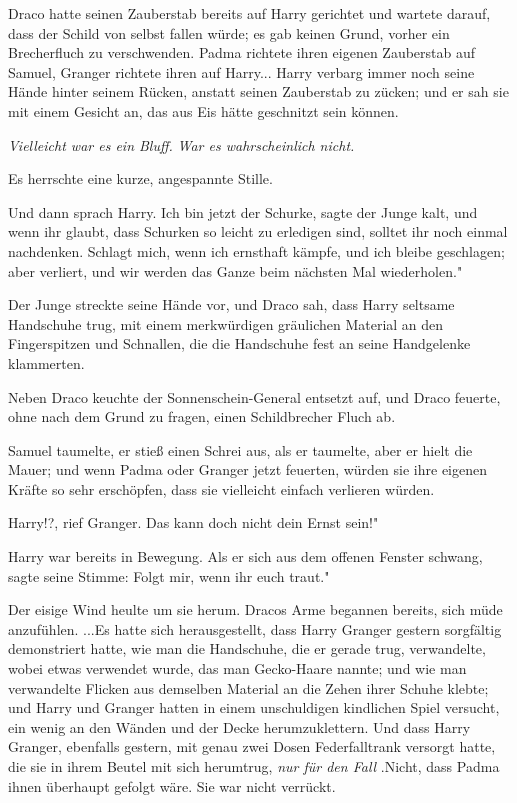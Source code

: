 Draco hatte seinen Zauberstab bereits auf Harry gerichtet und wartete darauf,
dass der Schild von selbst fallen würde; es gab keinen Grund, vorher ein
Brecherfluch zu verschwenden. Padma richtete ihren eigenen Zauberstab auf
Samuel, Granger richtete ihren auf Harry... Harry verbarg immer noch seine Hände
hinter seinem Rücken, anstatt seinen Zauberstab zu zücken; und er sah sie mit
einem Gesicht an, das aus Eis hätte geschnitzt sein können.

\emph{ Vielleicht war es ein Bluff.}
\emph{War es wahrscheinlich nicht.}

Es herrschte eine kurze, angespannte Stille.

Und dann sprach Harry. \glqq Ich bin jetzt der Schurke\grqq{}, sagte der Junge
kalt, \glqq und wenn ihr glaubt, dass Schurken so leicht zu erledigen sind,
solltet ihr noch einmal nachdenken. Schlagt mich, wenn ich ernsthaft kämpfe, und
ich bleibe geschlagen; aber verliert, und wir werden das Ganze beim nächsten Mal
wiederholen."

Der Junge streckte seine Hände vor, und Draco sah, dass Harry seltsame
Handschuhe trug, mit einem merkwürdigen gräulichen Material an den Fingerspitzen
und Schnallen, die die Handschuhe fest an seine Handgelenke klammerten.

Neben Draco keuchte der Sonnenschein-General entsetzt auf, und Draco feuerte,
ohne nach dem Grund zu fragen, einen Schildbrecher Fluch ab.

Samuel taumelte, er stieß einen Schrei aus, als er taumelte, aber er hielt die
Mauer; und wenn Padma oder Granger jetzt feuerten, würden sie ihre eigenen
Kräfte so sehr erschöpfen, dass sie vielleicht einfach verlieren würden.

\glqq Harry!?\grqq{}, rief Granger. \glqq Das kann doch nicht dein Ernst sein!"

Harry war bereits in Bewegung. Als er sich aus dem offenen Fenster schwang,
sagte seine Stimme: \glqq Folgt mir, wenn ihr euch traut."

Der eisige Wind heulte um sie herum. Dracos Arme begannen bereits, sich müde
anzufühlen. ...Es hatte sich herausgestellt, dass Harry Granger gestern
sorgfältig demonstriert hatte, wie man die Handschuhe, die er gerade trug,
verwandelte, wobei etwas verwendet wurde, das man \glqq Gecko-Haare\grqq{}
nannte; und wie man verwandelte Flicken aus demselben Material an die Zehen
ihrer Schuhe klebte; und Harry und Granger hatten in einem unschuldigen
kindlichen Spiel versucht, ein wenig an den Wänden und der Decke
herumzuklettern. Und dass Harry Granger, ebenfalls gestern, mit genau zwei Dosen
Federfalltrank versorgt hatte, die sie in ihrem Beutel mit sich herumtrug,
\emph{ \glqq nur für den Fall\grqq{} }.Nicht, dass Padma ihnen überhaupt gefolgt
wäre. Sie war nicht verrückt.

